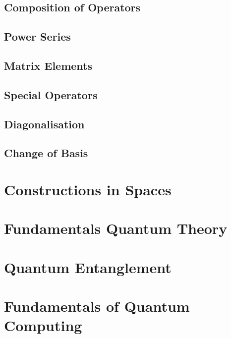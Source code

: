 \documentclass[12pt]{article}
\begin{document}
\subsection{Composition of Operators}


\subsection{Power Series}


\subsection{Matrix Elements}


\subsection{Special Operators}


\subsection{Diagonalisation}


\subsection{Change of Basis}

\pagebreak

\section{Constructions in Spaces}

\section{Fundamentals Quantum Theory}

\section{Quantum Entanglement}

\section{Fundamentals of Quantum Computing}
\end{document}
